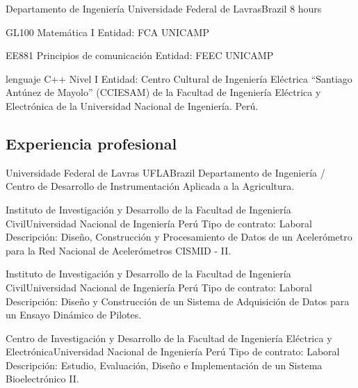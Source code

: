 \documentclass[11pt,a4paper,sans]{moderncv} %
\begin{document}
	      {Departamento de Ingeniería}
	      {Universidade Federal de Lavras}{Brazil}
	      {8 hours}
	      
			  {GL100 }{Matemática I}{}
			  {Entidad: FCA UNICAMP }

			  {EE881 }{Principios de comunicación}{}
			  {Entidad: FEEC UNICAMP }

	      {lenguaje C++ }{ Nivel I}{}
	      {Entidad: Centro Cultural de Ingeniería Eléctrica ``Santiago
 Antúnez de Mayolo'' (CCIESAM) de la Facultad de Ingeniería Eléctrica
 y Electrónica de la Universidad Nacional de Ingeniería. Perú.}

\subsection{Experiencia profesional}


	      {Universidade Federal de Lavras}
	      {UFLA}{Brazil}
	      {Departamento de Ingeniería / Centro de Desarrollo de Instrumentación Aplicada a la Agricultura.}


		      {Instituto de Investigación y Desarrollo de la Facultad
 de Ingeniería Civil}{Universidad Nacional de Ingeniería }{Perú}
		      {Tipo de contrato: Laboral\newline{}
		      Descripción: Diseño, Construcción y Procesamiento de Datos de un
 Acelerómetro para la Red Nacional de Acelerómetros CISMID - II.}

		      {Instituto de Investigación y Desarrollo de la Facultad
 de Ingeniería Civil}{Universidad Nacional de Ingeniería }{Perú}
		      {Tipo de contrato: Laboral\newline{}
		      Descripción: Diseño y Construcción de un Sistema de Adquisición de Datos para un Ensayo  Dinámico  de  Pilotes.}

		      {Centro de Investigación y Desarrollo de la Facultad de
 Ingeniería Eléctrica y Electrónica}{Universidad Nacional de Ingeniería }{Perú}
		      {Tipo de contrato: Laboral\newline{}
		      Descripción: Estudio, Evaluación, Diseño e Implementación de un Sistema Bioelectrónico II.}
\end{document}
